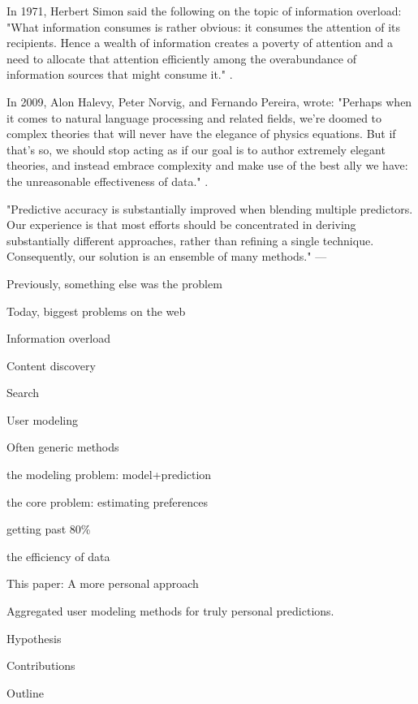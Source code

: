 In 1971, Herbert Simon said the following on the topic of information overload: 
"What information consumes is rather obvious: it consumes the attention of its recipients. 
Hence a wealth of information creates a poverty of attention and 
a need to allocate that attention efficiently among the overabundance of 
information sources that might consume it." \cite{Greenberger1971}.


In 2009, Alon Halevy, Peter Norvig, and Fernando Pereira, wrote:
"Perhaps when it comes to natural language processing and related fields, 
we’re doomed to complex theories that will never have the elegance of physics equations. 
But if that’s so, we should stop acting as if our goal is to author extremely elegant theories, 
and instead embrace complexity and make use of the best ally we have: 
the unreasonable effectiveness of data."
\cite{Halevy2009}.

"Predictive accuracy is substantially improved when blending multiple predictors. 
Our experience is that most efforts should be concentrated in deriving substantially 
different approaches, rather than refining a single technique. 
Consequently, our solution is an ensemble of many methods."
--- \cite{Bell2007}



Previously, something else was the problem

Today, biggest problems on the web

Information overload

Content discovery

Search

User modeling

Often generic methods

the modeling problem: model+prediction

the core problem: estimating preferences

getting past 80\%

the efficiency of data

This paper: A more personal approach

Aggregated user modeling methods for 
truly personal predictions.

Hypothesis

Contributions

Outline


